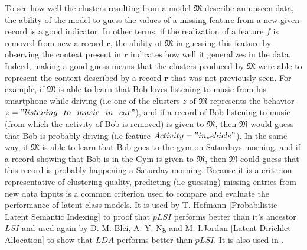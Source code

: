 To see how well the clusters resulting from a model $\mathfrak{M}$ describe an unseen data, the ability of the model to guess the values of a missing feature from a new given record is a good indicator. In other terms, if the realization of a feature $f$ is removed from new a record $\mathbf{r}$, the ability of $\mathfrak{M}$ in guessing this feature by observing the context present in $\mathbf{r}$ indicates how well it generalizes in the data. Indeed, making a good guess means that the clusters produced by $\mathfrak{M}$ were able to represent the context described by a record $\mathbf{r}$ that was not previously seen. For example, if $\mathfrak{M}$ is able to learn that Bob loves listening to music from his smartphone while driving (i.e one of the clusters $z$ of $\mathfrak{M}$ represents the behavior $z="listening\_to\_music\_in\_car"$), and if a record of Bob listening to music (from which the activity of Bob is removed) is given to $\mathfrak{M}$, then $\mathfrak{M}$ would guess that Bob is probably driving (i.e feature $Activity="in_vehicle"$). In the same way, if $\mathfrak{M}$ is able to learn that Bob goes to the gym on Saturdays morning, and if a record showing that Bob is in the Gym is given to $\mathfrak{M}$, then $\mathfrak{M}$ could guess that this record is probably happening a Saturday morning. Because it is a criterion representative of clustering quality, predicting (i.e guessing) missing entries from new data inputs is a common criterion used to compare and evaluate the performance of latent class models. It is used by T. Hofmann [Probabilistic Latent Semantic Indexing]\cite{plsi} to proof that $pLSI$ performs better than it's ancestor $LSI$\cite{lsi} and used again by D. M. Blei, A. Y. Ng and M. I.Jordan [Latent Dirichlet Allocation]\cite{lda} to show that $LDA$ performs better than $pLSI$. It is also used in \cite{inferencecomp, gibbsaverage, gibbsunseen}.\par

